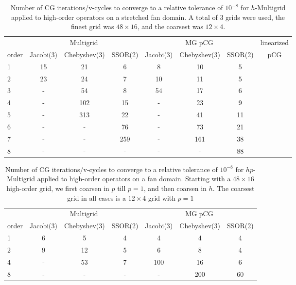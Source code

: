 \begin{table}
  \caption{\label{tab:homg} Number of CG iterations/v-cycles to converge to a relative tolerance of $10^{-8}$ for $h$-Multigrid applied to high-order operators on a stretched fan domain. A total of 3 grids were used, the finest grid was $48\times 16$, and the coarsest was $12\times 4$.}
		\centering
    \begin{tabular}{|l|c|c|c|c|c|c|c|} 
	    \hline
				    & \multicolumn{3}{c|}{Multigrid} & \multicolumn{3}{c|}{MG pCG} & linearized \\  \cline{2-7}
			order & \scriptsize Jacobi(3)  &\scriptsize  Chebyshev(3)  &\scriptsize SSOR(2) &\scriptsize Jacobi(3)  &\scriptsize  Chebyshev(3)  &\scriptsize SSOR(2) & pCG \\
			\hline
      
      1 & 15 & 21 & 6 & 8 & 10 & 5    &  \\ 
			2 & 23 & 24 & 7 & 10 & 11 & 5   &  \\
      3 & -  & 54 & 8 & 54 & 17 & 6   &  \\
      4 & -  & 102 & 15 & - & 23 & 9  &  \\
      5 & -  & 313 & 22 & - & 41 & 11 &  \\
      6 & - & - & 76 & - & 73 & 21    &  \\ 
      7 & - & - & 259 & - & 161 & 38  &  \\
      8 & - & - & - & - & - & 88      &  \\
      \hline
	  \end{tabular}
\end{table}


\begin{table}
  \caption{\label{tab:hpmg} Number of CG iterations/v-cycles to converge to a relative tolerance of $10^{-8}$ for $hp$-Multigrid applied to high-order operators on a fan domain. Starting with a $48\times 16$ high-order grid, we first coarsen in $p$ till $p=1$, and then coarsen in $h$. The coarsest grid in all cases is a $12\times 4$ grid with $p=1$}
		\centering
		\begin{tabular}{|l|c|c|c|c|c|c|} 
	    \hline
				    & \multicolumn{3}{c|}{Multigrid} & \multicolumn{3}{c|}{MG pCG}\\  \cline{2-7}
			order & \scriptsize Jacobi(3)  &\scriptsize  Chebyshev(3)  &\scriptsize SSOR(2) &\scriptsize Jacobi(3)  &\scriptsize  Chebyshev(3)  &\scriptsize SSOR(2) \\
			\hline
				1 & 6  &  5 &  4 & 4 & 4 & 4 \\ 
        2 & 9 & 12 & 5 & 6 & 8 & 4 \\
				4 & - & 53 & 7 & 100 & 16 & 6 \\
        8 & - & -  & - & - & 200 & 60 \\
			\hline
	  \end{tabular}
\end{table}



